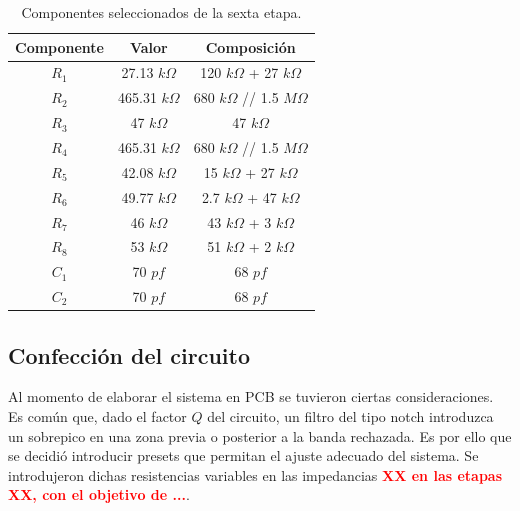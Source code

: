 \begin{multicols}{2}
\begin{table}[H]
\centering
\begin{tabular}{ccc}
\hline
\multicolumn{1}{c}{Componente} & \multicolumn{1}{c}{Valor} & Composición \\ \hline
$R_1$                           & 27.13 $k\Omega$                      & 120 $k\Omega$ + 27 $k\Omega$     \\
$R_2$                           & 465.31 $k\Omega$                    & 680 $k\Omega$ // 1.5 $M\Omega$  \\
$R_3$                           & 47 $k\Omega$                        & 47 $k\Omega$         \\
$R_4$                           & 465.31 $k\Omega$                    & 680 $k\Omega$ // 1.5 $M\Omega$  \\
$R_5$                           & 42.08 $k\Omega$                     & 15 $k\Omega$ + 27 $k\Omega$     \\
$R_6$                           & 49.77 $k\Omega$                     & 2.7 $k\Omega$ + 47 $k\Omega$    \\
$R_7$                           & 46 $k\Omega$                        & 43 $k\Omega$ + 3 $k\Omega$         \\
$R_8$                           & 53 $k\Omega$                        & 51 $k\Omega$ + 2 $k\Omega$         \\
$C_1$                           & 70 $pf$                       & 68 $pf$        \\
$C_2$                           & 70 $pf$                       & 68 $pf$  \\
\hline
\end{tabular}
\caption{Componentes seleccionados de la sexta etapa.}
\end{table}
\end{multicols}

\subsection{Confección del circuito}
Al momento de elaborar el sistema en PCB se tuvieron ciertas consideraciones. Es común que, dado el factor $Q$ del circuito, un filtro del tipo notch introduzca un sobrepico en una zona previa o posterior a la banda rechazada. Es por ello que se decidió introducir presets que permitan el ajuste adecuado del sistema. Se introdujeron dichas resistencias variables en las impedancias \textcolor{red}{\textbf{XX en las etapas XX, con el objetivo de ...}}.

